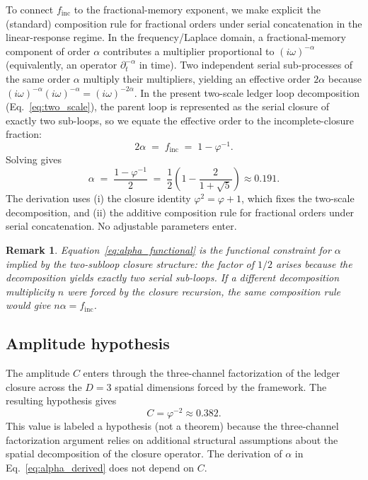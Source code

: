 \documentclass[entropy,article,submit,pdftex,moreauthors]{Definitions/mdpi}
\newtheorem{remarkX}[theoremX]{Remark}
\begin{document}
To connect \(f_{\mathrm{inc}}\) to the fractional-memory exponent, we make explicit the (standard) composition rule for fractional orders under serial concatenation in the linear-response regime. In the frequency/Laplace domain, a fractional-memory component of order \(\alpha\) contributes a multiplier proportional to \((i\omega)^{-\alpha}\) (equivalently, an operator \(\partial_t^{-\alpha}\) in time). Two independent serial sub-processes of the same order \(\alpha\) multiply their multipliers, yielding an effective order \(2\alpha\) because \((i\omega)^{-\alpha}(i\omega)^{-\alpha}=(i\omega)^{-2\alpha}\). In the present two-scale ledger loop decomposition (Eq.~\ref{eq:two_scale}), the parent loop is represented as the serial closure of exactly two sub-loops, so we equate the effective order to the incomplete-closure fraction:
\begin{equation}
  2\alpha \;=\; f_{\mathrm{inc}} \;=\; 1-\varphi^{-1}.
  \label{eq:alpha_functional}
\end{equation}
Solving gives
\begin{equation}
  \alpha \;=\; \frac{1-\varphi^{-1}}{2} \;=\; \frac{1}{2}\left(1-\frac{2}{1+\sqrt{5}}\right) \approx 0.191.
  \label{eq:alpha_derived}
\end{equation}
The derivation uses (i) the closure identity \(\varphi^2=\varphi+1\), which fixes the two-scale decomposition, and (ii) the additive composition rule for fractional orders under serial concatenation. No adjustable parameters enter.

\begin{remarkX}
Equation~\eqref{eq:alpha_functional} is the functional constraint for \(\alpha\) implied by the two-subloop closure structure: the factor of \(1/2\) arises because the decomposition yields exactly two serial sub-loops. If a different decomposition multiplicity \(n\) were forced by the closure recursion, the same composition rule would give \(n\alpha=f_{\mathrm{inc}}\).
\end{remarkX}

\subsection{Amplitude hypothesis}
\label{subsec:C_hypothesis}

The amplitude \(C\) enters through the three-channel factorization of the ledger closure across the \(D=3\) spatial dimensions forced by the framework. The resulting hypothesis gives
\begin{equation}
  C = \varphi^{-2} \approx 0.382.
  \label{eq:C_hypothesis}
\end{equation}
This value is labeled a hypothesis (not a theorem) because the three-channel factorization argument relies on additional structural assumptions about the spatial decomposition of the closure operator. The derivation of \(\alpha\) in Eq.~\eqref{eq:alpha_derived} does not depend on \(C\).
\end{document}
